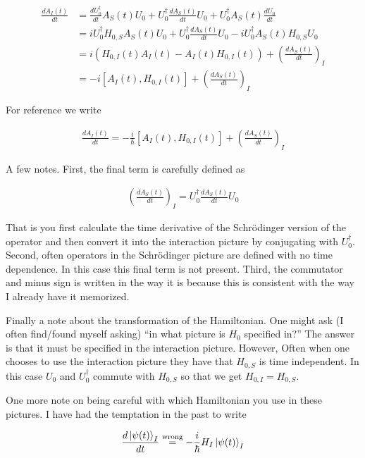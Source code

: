 \documentclass[12pt]{article}
\begin{document}
\begin{align}
\frac{d A_I(t)}{d t} &= \frac{d U_0^{\dag}}{d t} A_S(t) U_0 + U_0^{\dag} \frac{d A_S(t)}{d t} U_0 + U_0^{\dag} A_S(t) \frac{d U_0}{d t}\\
&= i U_0^{\dag}H_{0,S} A_S(t)U_0 + U_0^{\dag} \frac{d A_S(t)}{d t} U_0 - i U_0^{\dag}A_S(t)H_{0,S} U_0\\
&= i\left(H_{0,I}(t)A_I(t) - A_I(t)H_{0,I}(t)\right) + \left(\frac{d A_S(t)}{d t} \right)_I\\
&= -i\left[A_I(t), H_{0,I}(t)\right] + \left(\frac{d A_S(t)}{d t}\right)_I
\end{align}

For reference we write

\begin{align}
\boxed{\frac{d A_I(t)}{d t} = -\frac{i}{\hbar} \left[A_I(t), H_{0,I}(t)\right] + \left(\frac{d A_S(t)}{d t} \right)_I}
\end{align}

A few notes. First, the final term is carefully defined as

\begin{align}
\left(\frac{d A_S(t)}{d t} \right)_I = U_0^{\dag} \frac{d A_S(t)}{d t} U_0 
\end{align}

That is you first calculate the time derivative of the Schr{\"o}dinger version of the operator and then convert it into the interaction picture by conjugating with $U_0^{\dag}$. Second, often operators in the Schr{\"o}dinger picture are defined with no time dependence. In this case this final term is not present. Third, the commutator and minus sign is written in the way it is because this is consistent with the way I already have it memorized.

Finally a note about the transformation of the Hamiltonian. One might ask (I often find/found myself asking) ``in what picture is $H_0$ specified in?'' The answer is that it must be specified in the interaction picture. However, Often when one chooses to use the interaction picture they have that $H_{0,S}$ is time independent. In this case $U_0$ and $U_0^{\dag}$ commute with $H_{0,S}$ so that we get $H_{0,I} = H_{0,S}$.

One more note on being careful with which Hamiltonian you use in these pictures. I have had the temptation in the past to write

\begin{align}
\frac{d \ket{\psi(t)}_I}{d t} \overset{\text{wrong}}{=} -\frac{i}{\hbar} H_I \ket{\psi(t)}_I
\end{align}
\end{document}
